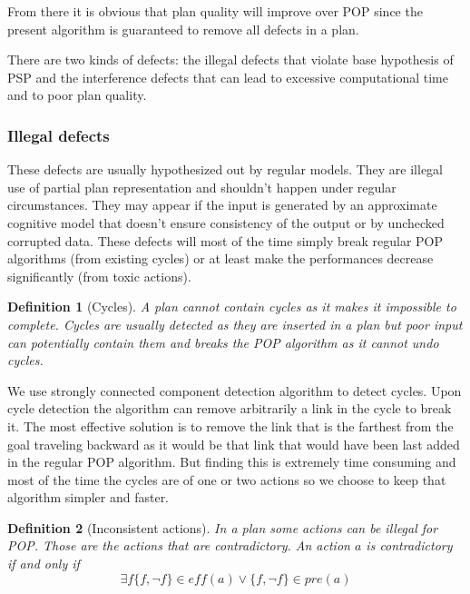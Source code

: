 \documentclass[]{article}
\newtheorem{definition}{Definition}
\begin{document}
From there it is obvious that plan quality will improve over POP since
the present algorithm is guaranteed to remove all defects in a plan.

There are two kinds of defects: the illegal defects that violate base
hypothesis of PSP and the interference defects that can lead to
excessive computational time and to poor plan quality.

\subsubsection{Illegal defects}\label{illegal-defects}

These defects are usually hypothesized out by regular models. They are
illegal use of partial plan representation and shouldn't happen under
regular circumstances. They may appear if the input is generated by an
approximate cognitive model that doesn't ensure consistency of the
output or by unchecked corrupted data. These defects will most of the
time simply break regular POP algorithms (from existing cycles) or at
least make the performances decrease significantly (from toxic actions).

\begin{definition}[Cycles]

A plan cannot contain cycles as it makes it impossible to complete.
Cycles are usually detected as they are inserted in a plan but poor
input can potentially contain them and breaks the POP algorithm as it
cannot undo cycles.

\end{definition}

We use strongly connected component detection algorithm to detect
cycles. Upon cycle detection the algorithm can remove arbitrarily a link
in the cycle to break it. The most effective solution is to remove the
link that is the farthest from the goal traveling backward as it would
be that link that would have been last added in the regular POP
algorithm. But finding this is extremely time consuming and most of the
time the cycles are of one or two actions so we choose to keep that
algorithm simpler and faster.

\begin{definition}[Inconsistent actions]

In a plan some actions can be illegal for POP. Those are the actions
that are contradictory. An action \(a\) is contradictory if and only if
\[\exists f \{f, \lnot f \} \in eff(a) \lor \{f, \lnot f \} \in pre(a)\]

\end{definition}
\end{document}
